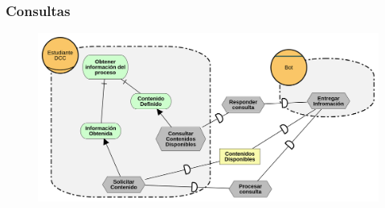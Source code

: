     \subsubsection{Consultas}
        \begin{figure}[ht]
            \centering
            \includegraphics[width=\textwidth]{media/imagenes/i_star/diagramas/Consultas.png}
            \caption{}
            \label{}
        \end{figure}

